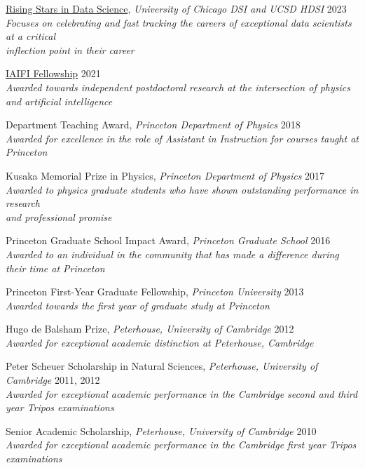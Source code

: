 \documentclass[letterpaper,11pt]{article}
\newenvironment{packed_itemize}{
\begin{itemize}[label=\raisebox{0.25ex}{\tiny$\bullet$}]
  \setlength{\itemsep}{4.2pt}
  \setlength{\parskip}{0pt}
  \setlength{\parsep}{0pt}}{\end{itemize}
}
\begin{document}
\begin{packed_itemize}
  \item \href{https://datascience.uchicago.edu/research/postdoctoral-programs/rising-stars-in-data-science-2/2023-rising-stars/}{Rising Stars in Data Science}, \emph{University of Chicago DSI and UCSD HDSI} \hfill 2023 \\ \emph{\small Focuses on celebrating and fast tracking the careers of exceptional data scientists at a critical \\ inflection point in their career}
  \item \href{https://iaifi.org/current-fellows.html}{IAIFI Fellowship} \hfill 2021 \\ \emph{\small Awarded towards independent postdoctoral research at the intersection of physics and artificial intelligence}
  \item Department Teaching Award, \emph{Princeton Department of Physics}  \hfill 2018 \\ \emph{\small Awarded for excellence in the role of Assistant in Instruction for courses taught at Princeton}
  \item Kusaka Memorial Prize in Physics, \emph{Princeton Department of Physics} \hfill 2017 \\ \emph{\small Awarded to physics graduate students who have shown outstanding performance in research \\ and professional promise}
  \item Princeton Graduate School Impact Award, \emph{Princeton Graduate School} \hfill 2016 \\ \emph{\small Awarded to an individual in the community that has made a difference during their time at Princeton}
  \item Princeton First-Year Graduate Fellowship, \emph{Princeton University} \hfill 2013 \\ \emph{\small Awarded towards the first year of graduate study at Princeton}
  \item Hugo de Balsham Prize, \emph{Peterhouse, University of Cambridge}  \hfill 2012 \\ \emph{\small Awarded for exceptional academic distinction at Peterhouse, Cambridge}
  \item Peter Scheuer Scholarship in Natural Sciences, \emph{Peterhouse, University of Cambridge} \hfill 2011, 2012 \\ \emph{\small Awarded for exceptional academic performance in the Cambridge second and third year Tripos examinations}
  \item Senior Academic Scholarship, \emph{Peterhouse, University of Cambridge} \hfill 2010\\ \emph{\small Awarded for exceptional academic performance in the Cambridge first year Tripos examinations}
\end{packed_itemize}
\vspace{2.0mm}
\end{document}
